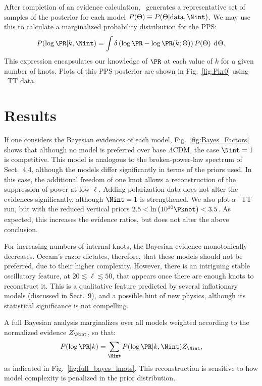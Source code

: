 After completion of an evidence calculation, \PolyChord\ generates a representative set of samples of the posterior for each model \(P(\Theta) \equiv P(\Theta|\mathrm{data},\Nint)\). We may use this to calculate a marginalized probability distribution for the PPS\@:
\begin{equation}
  P(\log\PR|k,\Nint) = \int \delta\left(\log\PR - \log\PR(k;\Theta)\right)P(\Theta)\:\d{\Theta}.
  \label{eqn:margPR}
\end{equation}
This expression encapsulates our knowledge of \(\PR\) at each value of \(k\) for a given number of knots.  Plots of this PPS posterior are shown in Fig.~\ref{fig:Pkr0} using \Planck\ TT data.


\section{Results}
If one considers the Bayesian evidences of each model, Fig.~\ref{fig:Bayes_Factors} shows that although no model is preferred over base \(\Lambda\)CDM, the case \(\Nint=1\) is competitive. This model is analogous to the broken-power-law spectrum of Sect.~4.4, although the models differ significantly in terms of the priors used. In this case, the additional freedom of one knot allows a reconstruction of the suppression of power at low \(\ell\). Adding polarization data does not alter the evidences significantly, although \(\Nint=1\) is strengthened. We also plot a \Planck\ TT run, but with the reduced vertical priors \({2.5<\ln\left(10^{10}\Pknot\right)<3.5}\).  As expected, this increases the evidence ratios, but does not alter the above conclusion.

For increasing numbers of internal knots, the Bayesian evidence monotonically decreases. Occam's razor dictates, therefore, that these models should not be preferred, due to their higher complexity. However, there is an intriguing stable oscillatory feature, at \(20\lesssim\ell\lesssim50\), that appears once there are enough knots to reconstruct it.  This is a qualitative feature predicted by several inflationary models (discussed in Sect.~9), and a possible hint of new physics, although its statistical significance is not compelling.

A full Bayesian analysis marginalizes over all models weighted according to the normalized evidence \(Z_{\Nint}\), so that:
\begin{equation}
  P(\log\PR|k) = \sum\limits_{\Nint} P(\log\PR|k,\Nint) Z_{\Nint},
  \label{eqn:margPR_full}
\end{equation}
as indicated in Fig.~\ref{fig:full_bayes_knots}.  This reconstruction is sensitive to how model complexity is penalized in the prior distribution. 


